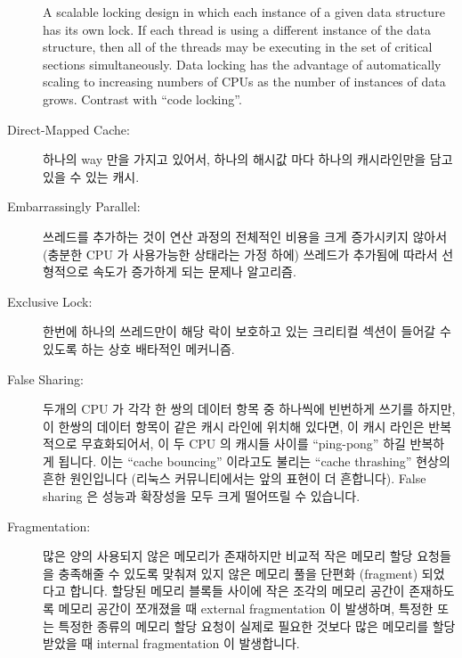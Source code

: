 \begin{description}
	A scalable locking design in which each instance of a given
	data structure has its own lock.
	If each thread is using a different instance of the
	data structure, then all of the threads may be executing in
	the set of critical sections simultaneously.
	Data locking has the advantage of automatically scaling to
	increasing numbers of CPUs as the number of instances of
	data grows.
	Contrast with ``code locking''.
	\fi
\item[Direct-Mapped Cache:]
	하나의 way 만을 가지고 있어서, 하나의 해시값 마다 하나의 캐시라인만을
	담고 있을 수 있는 캐시.
	\iffalse

	A cache with only one way, so that it may hold only one cache
	line with a given hash value.
	\fi
\item[Embarrassingly Parallel:]
	쓰레드를 추가하는 것이 연산 과정의 전체적인 비용을 크게 증가시키지
	않아서 (충분한 CPU 가 사용가능한 상태라는 가정 하에) 쓰레드가 추가됨에
	따라서 선형적으로 속도가 증가하게 되는 문제나 알고리즘.
	\iffalse

	A problem or algorithm where adding threads does not significantly
	increase the overall cost of the computation, resulting in
	linear speedups as threads are added (assuming sufficient
	CPUs are available).
	\fi
\item[Exclusive Lock:]
	한번에 하나의 쓰레드만이 해당 락이 보호하고 있는 크리티컬 섹션이 들어갈
	수 있도록 하는 상호 배타적인 메커니즘.
	\iffalse

	An exclusive lock is a mutual-exclusion mechanism that
	permits only one thread at a time into the
	set of critical sections guarded by that lock.
	\fi
\item[False Sharing:]
	두개의 CPU 가 각각 한 쌍의 데이터 항목 중 하나씩에 빈번하게 쓰기를
	하지만, 이 한쌍의 데이터 항목이 같은 캐시 라인에 위치해 있다면, 이 캐시
	라인은 반복적으로 무효화되어서, 이 두 CPU 의 캐시들 사이를
	``ping-pong'' 하길 반복하게 됩니다.
	이는 ``cache bouncing'' 이라고도 불리는 ``cache thrashing'' 현상의 흔한
	원인입니다 (리눅스 커뮤니티에서는 앞의 표현이 더 흔합니다).
	False sharing 은 성능과 확장성을 모두 크게 떨어뜨릴 수 있습니다.
	\iffalse

	If two CPUs each frequently write to one of a pair of data items,
	but the pair of data items are located in the same cache line,
	this cache line will be repeatedly invalidated, ``ping-ponging''
	back and forth between the two CPUs' caches.
	This is a common cause of ``cache thrashing'', also called
	``cacheline bouncing'' (the latter most commonly in the Linux
	community).
	False sharing can dramatically reduce both performance and
	scalability.
	\fi
\item[Fragmentation:]
	많은 양의 사용되지 않은 메모리가 존재하지만 비교적 작은 메모리 할당
	요청들을 충족해줄 수 있도록 맞춰져 있지 않은 메모리 풀을 단편화
	(fragment) 되었다고 합니다.
	할당된 메모리 블록들 사이에 작은 조각의 메모리 공간이 존재하도록 메모리
	공간이 쪼개졌을 때 external fragmentation 이 발생하며, 특정한 또는
	특정한 종류의 메모리 할당 요청이 실제로 필요한 것보다 많은 메모리를
	할당받았을 때 internal fragmentation 이 발생합니다.
	\iffalse


\end{description}
